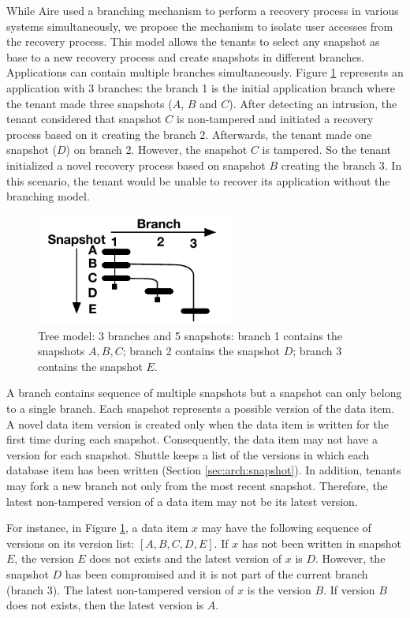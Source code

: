 While Aire \cite{retro} used a branching mechanism to perform a recovery process in various systems simultaneously, we propose the mechanism to isolate user accesses from the recovery process. This model allows the tenants to select any snapshot as base to a new recovery process and create snapshots in different branches. Applications can contain multiple branches simultaneously. Figure \ref{fig:branches} represents an application with 3 branches: the branch 1 is the initial application branch where the tenant made three snapshots ($A$, $B$ and $C$). After detecting an intrusion, the tenant considered that snapshot $C$ is non-tampered and initiated a recovery process based on it creating the branch 2. Afterwards, the tenant made one snapshot ($D$) on branch 2. However, the snapshot $C$ is tampered. So the tenant initialized a novel recovery process based on snapshot $B$ creating the branch 3. In this scenario, the tenant would be unable to recover its application without the branching model.


\begin{figure}
\centering
\includegraphics[width=65mm]{images/branches}
\caption[Tree model]{Tree model: 3 branches and 5 snapshots: branch 1 contains the snapshots $A, B, C$; branch 2 contains the snapshot $D$;  branch 3 contains the snapshot $E$.}
\label{fig:branches}
\end{figure}

A branch contains sequence of multiple snapshots but a snapshot can only belong to a single branch. Each snapshot represents a possible version of the data item. A novel data item version is created only when the data item is written for the first time during each snapshot. Consequently, the data item may not have a version for each snapshot. Shuttle keeps a list of the versions in which each database item has been written (Section \ref{sec:arch:snapshot}).
In addition, tenants may fork a new branch not only from the most recent snapshot. Therefore, the latest non-tampered version of a data item may not be its latest version.

For instance, in Figure \ref{fig:branches}, a data item $x$ may have the following sequence of versions on its version list: $[A,B,C,D,E]$. If $x$ has not been written in snapshot $E$, the version $E$ does not exists and the latest version of $x$ is $D$. However, the snapshot $D$ has been compromised and it is not part of the current branch (branch 3). The latest non-tampered version of $x$ is the version $B$. If version $B$ does not exists, then the latest version is $A$.

